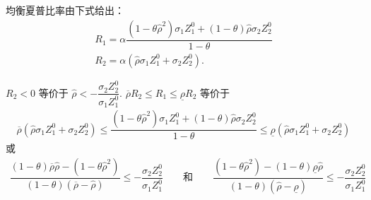 \documentclass[10.0pt]{article}
\begin{document}
均衡夏普比率由下式给出：
\begin{eqnarray}
& R_1 = \alpha \dfrac{(1 - \theta {\hat \rho}^2) \sigma_1 Z_1^0 + (1 - \theta) {\hat \rho} \sigma_2 Z_2^0}{1 - \theta} & \\
& R_2 = \alpha ({\hat \rho} \sigma_1 Z_1^0 + \sigma_2 Z_2^0). &
\end{eqnarray}

$ R_2 < 0 $ 等价于 $ {\hat \rho} < - \dfrac{\sigma_2 Z_2^0}{\sigma_1 Z_1^0} $.
$ \overline{\rho} R_2 \leqslant R_1 \leqslant \underline{\rho} R_2 $ 等价于   
\begin{eqnarray*}
\overline{\rho} ({\hat \rho} \sigma_1 Z_1^0 + \sigma_2 Z_2^0) \leqslant \dfrac{(1 - \theta {\hat \rho}^2) \sigma_1 Z_1^0 + (1 - \theta) {\hat \rho} \sigma_2 Z_2^0}{1 - \theta} \leqslant \underline{\rho} ({\hat \rho} \sigma_1 Z_1^0 + \sigma_2 Z_2^0)
\end{eqnarray*}
或
\begin{eqnarray*}
\dfrac{(1 - \theta) \overline{\rho} {\hat \rho} - (1 - \theta {\hat \rho}^2)}{(1 - \theta) (\overline{\rho} - {\hat \rho})} \leqslant - \dfrac{\sigma_2 Z_2^0}{\sigma_1 Z_1^0} \qquad \text{和} \qquad \dfrac{(1 - \theta {\hat \rho}^2) - (1 - \theta) \underline{\rho} {\hat \rho}}{(1 - \theta) ({\hat \rho} - \underline{\rho})} \leqslant - \dfrac{\sigma_2 Z_2^0}{\sigma_1 Z_1^0}
\end{eqnarray*}
\end{document}
